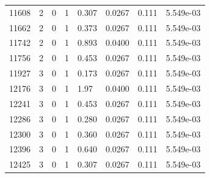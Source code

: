 \documentclass[preview]{standalone}
\begin{document}
{{{{{{{{{{{{{\begin{tabular}{L{1.2cm}C{1.2cm} C{0.3cm}C{0.5cm} C{1.4cm}C{1.4cm} C{1.4cm}C{1.4cm}}
  11608  &     2  & 0     &  1 &  0.307  & 0.0267  & 0.111 &  5.549e-03   \\ 
  11662  &     2  & 0     &  1 &  0.373  & 0.0267  & 0.111 &  5.549e-03   \\ 
  11742  &     2  & 0     &  1 &  0.893  & 0.0400  & 0.111 &  5.549e-03   \\ 
  11756  &     2  & 0     &  1 &  0.453  & 0.0267  & 0.111 &  5.549e-03   \\ 
  11927  &     3  & 0     &  1 &  0.173  & 0.0267  & 0.111 &  5.549e-03   \\ 
  12176  &     3  & 0     &  1 &  1.97  & 0.0400  & 0.111 &  5.549e-03   \\ 
  12241  &     3  & 0     &  1 &  0.453  & 0.0267  & 0.111 &  5.549e-03   \\ 
  12286  &     3  & 0     &  1 &  0.280  & 0.0267  & 0.111 &  5.549e-03   \\ 
  12300  &     3  & 0     &  1 &  0.360  & 0.0267  & 0.111 &  5.549e-03   \\ 
  12396  &     3  & 0     &  1 &  0.640  & 0.0267  & 0.111 &  5.549e-03   \\ 
  12425  &     3  & 0     &  1 &  0.307  & 0.0267  & 0.111 &  5.549e-03   \\ 
\hline 
\end{tabular} 

}}}}}}}}}}}}}
\end{document}
